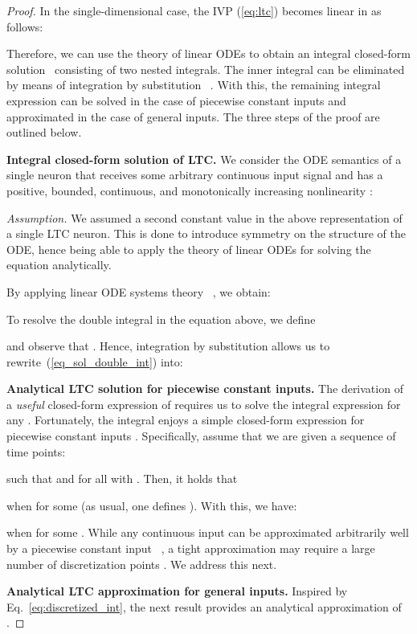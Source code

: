 \documentclass[12pt]{article}
\begin{document}
\begin{proof}
In the single-dimensional case, the IVP (\ref{eq:ltc}) becomes linear in  as follows:



\noindent Therefore, we can use the theory of linear ODEs to obtain an integral closed-form solution~ \cite[Section 1.10]{PerkoODEs} consisting of two nested integrals. The inner integral can be eliminated by means of integration by substitution~ \cite{Rudin76}. With this, the remaining integral expression can be solved in the case of piecewise constant inputs and approximated in the case of general inputs. The three steps of the proof are outlined below.

\noindent \textbf{Integral closed-form solution of LTC.} We consider the ODE semantics of a single neuron that receives some arbitrary continuous input signal  and has a positive, bounded, continuous, and monotonically increasing nonlinearity :


\noindent \textit{Assumption.} We assumed a second constant value  in the above representation of a single LTC neuron. This is done to introduce symmetry on the structure of the ODE, hence being able to apply the theory of linear ODEs for solving the equation analytically.

\noindent By applying linear ODE systems theory~ \cite[Section 1.10]{PerkoODEs}, we obtain:


\noindent To resolve the double integral in the equation above, we define

and observe that . Hence, integration by substitution allows us to rewrite~(\ref{eq_sol_double_int}) into:


\noindent \textbf{Analytical LTC solution for piecewise constant inputs.} The derivation of a \emph{useful} closed-form expression of  requires us to solve the integral expression  for any . Fortunately, the integral  enjoys a simple closed-form expression for piecewise constant inputs . Specifically, assume that we are given a sequence of time points:

such that  and  for all  with . Then, it holds that

when  for some  (as usual, one defines ). With this, we have:

when  for some . While any continuous input can be approximated arbitrarily well by a piecewise constant input~ \cite{Rudin76}, a tight approximation may require a large number of discretization points . We address this next.

\noindent \textbf{Analytical LTC approximation for general inputs.} Inspired by Eq.~\ref{eq:discretized_int}, the next result provides an analytical approximation of .


\end{proof}
\end{document}
